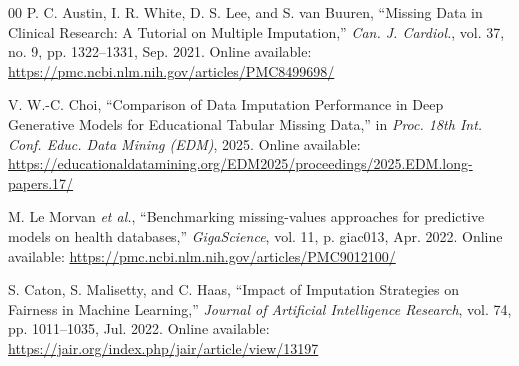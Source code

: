 \documentclass[journal]{IEEEtran}
\begin{document}
\begin{thebibliography}{00}
P. C. Austin, I. R. White, D. S. Lee, and S. van Buuren, ``Missing Data in Clinical Research: A Tutorial on Multiple Imputation,'' \textit{Can. J. Cardiol.}, vol. 37, no. 9, pp. 1322--1331, Sep. 2021. Online available: \url{https://pmc.ncbi.nlm.nih.gov/articles/PMC8499698/}

V. W.-C. Choi, ``Comparison of Data Imputation Performance in Deep Generative Models for Educational Tabular Missing Data,'' in \textit{Proc. 18th Int. Conf. Educ. Data Mining (EDM)}, 2025. Online available: \url{https://educationaldatamining.org/EDM2025/proceedings/2025.EDM.long-papers.17/}

M. Le Morvan \textit{et al.}, ``Benchmarking missing-values approaches for predictive models on health databases,'' \textit{GigaScience}, vol. 11, p. giac013, Apr. 2022. Online available: \url{https://pmc.ncbi.nlm.nih.gov/articles/PMC9012100/}

S. Caton, S. Malisetty, and C. Haas, ``Impact of Imputation Strategies on Fairness in Machine Learning,'' \textit{Journal of Artificial Intelligence Research}, vol. 74, pp. 1011--1035, Jul. 2022. Online available: \url{https://jair.org/index.php/jair/article/view/13197}

\end{thebibliography}
\end{document}
